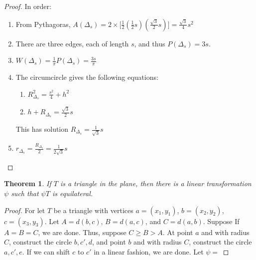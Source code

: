 \documentclass[oneside]{book}
\theoremstyle{mystyle}
\newtheorem{theorem}{Theorem}[section]
\begin{document}
%
\begin{proof}
In order:
\begin{enumerate}
\item From Pythagoras, $A(\Delta_s) =2\times\big[\frac{1}{2}(\frac{1}{2}s)(\frac{\sqrt{3}}{2}s)\big] = \frac{\sqrt{3}}{4}s^2$
\item There are three edges, each of length $s$, and thus $P(\Delta_s) = 3s$.
\item $W(\Delta_s) = \frac{1}{\pi}P(\Delta_s) = \frac{3s}{\pi}$
\item The circumcircle gives the following equations:
\begin{enumerate}
\item $R_{\Delta_s}^2=\frac{s^2}{4}+h^2$
\item $h+R_{\Delta_s} = \frac{\sqrt{3}}{2}s$
\end{enumerate}
This has solution $R_{\Delta_s}=\frac{1}{\sqrt{3}}s$
\item $r_{\Delta_s} = \frac{R_{\Delta_s}}{2}= \frac{1}{2\sqrt{3}}s$
\end{enumerate}
\end{proof}

\begin{theorem}
If $T$ is a triangle in the plane, then there is a linear transformation $\psi$ such that $\psi T$ is equilateral.
\end{theorem}
\begin{proof}
For let $T$ be a triangle with vertices $a=(x_1,y_1)$, $b=(x_2,y_2)$, $c=(x_3,y_3)$. Let $A = d(b,c)$, $B=d(a,c)$, and $C=d(a,b)$. Suppose If $A=B=C$, we are done. Thus, suppose $C\geq B >A$. At point $a$ and with radius $C$, construct the circle $b,c',d$, and point $b$ and with radius $C$, construct the circle $a,c',e$. If we can shift $c$ to $c'$ in a linear fashion, we are done. Let $\psi =$
\end{proof} 
\end{document}
